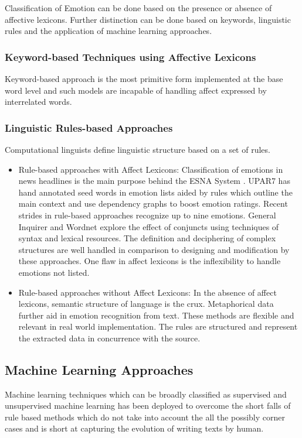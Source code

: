\documentclass[conference]{IEEEtran}
\numberwithin{equation}{section}
\numberwithin{figure}{section}
\numberwithin{table}{section}
\begin{document}
Classification of Emotion can be done based on the presence or absence of affective lexicons. Further distinction can be done based on keywords, linguistic rules and the application of machine learning approaches. 
\subsubsection{ Keyword-based Techniques using Affective Lexicons}\label{sec:cap-num}
Keyword-based approach is the most primitive form implemented at the base word level and such models are incapable of handling affect expressed by interrelated words. 

\subsubsection{Linguistic Rules-based Approaches}\label{sec:positioning}
Computational linguists define linguistic structure based on a set of rules. 

\begin{itemize}
\item Rule-based approaches with Affect Lexicons: Classification of emotions in news headlines is the main purpose behind the ESNA System \cite{esna}. UPAR7 has hand annotated seed words in emotion lists aided by rules which outline the main context and use dependency graphs to boost emotion ratings. Recent strides in rule-based approaches recognize up to nine emotions. General Inquirer and Wordnet explore the effect of conjuncts using techniques of syntax and lexical resources. The definition and deciphering of complex structures are well handled in comparison to designing and modification by these approaches. One flaw in affect lexicons is the inflexibility to handle emotions not listed. 

\item Rule-based approaches without Affect Lexicons: In the absence of affect lexicons, semantic structure of language is the crux. Metaphorical data further aid in emotion recognition from text. These methods are flexible and relevant in real world implementation. The rules are structured and represent the extracted data in concurrence with the source. 

\end{itemize}


\subsection{Machine Learning Approaches}\label{sec:formatting-text}
Machine learning techniques which can be broadly classified as supervised and unsupervised machine learning has been deployed to overcome the short falls of rule based methods which do not take into account the all the possibly corner cases and is short at capturing the evolution of writing texts by human.
\end{document}
